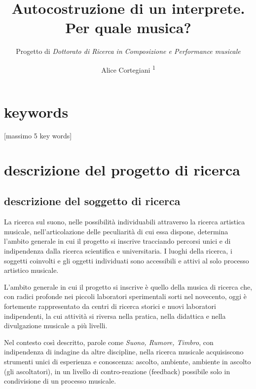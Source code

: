 \documentclass{gs-adonis}
\title{Autocostruzione di un interprete.\\
       Per quale musica?}
\subtitle{Progetto di \emph{Dottorato di Ricerca in Composizione e Performance musicale}}
\author{Alice Cortegiani \textsuperscript{1}}
\begin{document}
\maketitle

\section*{keywords}

[massimo 5 key words]


\section{descrizione del progetto di ricerca}%

\subsection{descrizione del soggetto di ricerca}%


La ricerca sul suono, nelle possibilità individuabili attraverso la ricerca
artistica musicale, nell'articolazione delle peculiarità di cui essa dispone,
determina l'ambito generale in cui il progetto si inscrive tracciando percorsi
unici e di indipendenza dalla ricerca scientifica e universitaria. I luoghi
della ricerca, i soggetti coinvolti e gli oggetti individuati sono accessibili
e attivi al solo processo artistico musicale.

L'ambito generale in cui il progetto si inscrive è quello della musica di
ricerca che, con radici profonde nei piccoli laboratori sperimentali sorti nel
novecento, oggi è fortemente rappresentato da centri di ricerca storici e
nuovi laboratori indipendenti, la cui attività si riversa nella pratica, nella
didattica e nella divulgazione musicale a più livelli.

Nel contesto così descritto, parole come \emph{Suono, Rumore, Timbro},
con indipendenza di indagine da altre discipline, nella ricerca musicale
acquisiscono strumenti unici di esperienza e conoscenza: ascolto, ambiente,
ambiente in ascolto (gli ascoltatori), in un livello di contro-reazione
(feedback) possibile solo in condivisione di un processo musicale.
\end{document}
